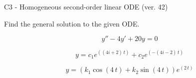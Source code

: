 \begin{exercise}
  \begin{exerciseTitle}C3 - Homogeneous second-order linear ODE (ver. 42)\end{exerciseTitle}
  \begin{exerciseStatement}
    
Find the general solution to the given ODE.

    
\[y''-4y'+20y = 0\]

  \end{exerciseStatement}
  \begin{exerciseAnswer}
    
\[y= c_{1} e^{\left(\left(4 i + 2\right) \, t\right)} + c_{2} e^{\left(-\left(4 i - 2\right) \, t\right)}\]

    
\[y= {\left(k_{1} \cos\left(4 \, t\right) + k_{2} \sin\left(4 \, t\right)\right)} e^{\left(2 \, t\right)}\]

  \end{exerciseAnswer}
\end{exercise}